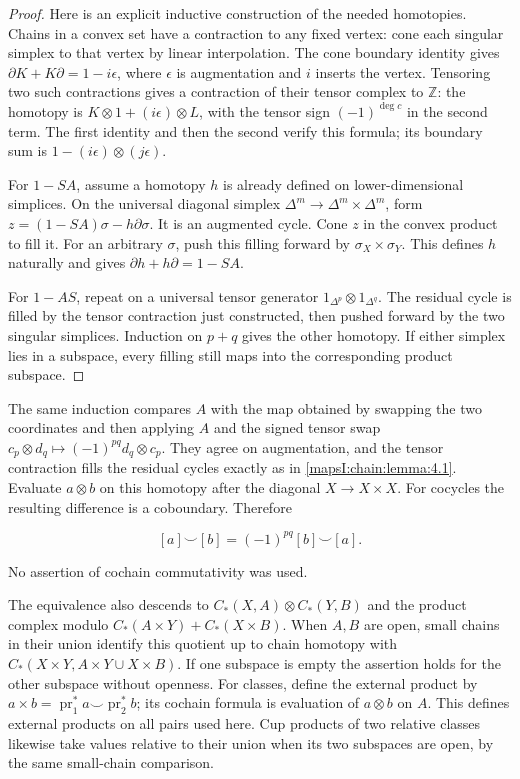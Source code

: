 \documentclass[11pt]{article}
\begin{document}
\begin{proof}
Here is an explicit inductive construction of the needed homotopies. Chains in a convex set have a contraction to any fixed vertex: cone each singular simplex to that vertex by linear interpolation. The cone boundary identity gives \(\partial K+K\partial=1-i\epsilon\), where \(\epsilon\) is augmentation and \(i\) inserts the vertex. Tensoring two such contractions gives a contraction of their tensor complex to \(\mathbb Z\): the homotopy is \(K\otimes1+(i\epsilon)\otimes L\), with the tensor sign \((-1)^{\deg c}\) in the second term. The first identity and then the second verify this formula; its boundary sum is \(1-(i\epsilon)\otimes(j\epsilon)\).

For \(1-SA\), assume a homotopy \(h\) is already defined on lower-dimensional simplices. On the universal diagonal simplex \(\Delta^m\to\Delta^m\times\Delta^m\), form
\(z=(1-SA)\sigma-h\partial\sigma\).
It is an augmented cycle. Cone \(z\) in the convex product to fill it. For an arbitrary \(\sigma\), push this filling forward by \(\sigma_X\times\sigma_Y\). This defines \(h\) naturally and gives \(\partial h+h\partial=1-SA\).

For \(1-AS\), repeat on a universal tensor generator \(1_{\Delta^p}\otimes1_{\Delta^q}\). The residual cycle is filled by the tensor contraction just constructed, then pushed forward by the two singular simplices. Induction on \(p+q\) gives the other homotopy. If either simplex lies in a subspace, every filling still maps into the corresponding product subspace.
\end{proof}

The same induction compares \(A\) with the map obtained by swapping the two coordinates and then applying \(A\) and the signed tensor swap
\(c_p\otimes d_q\mapsto(-1)^{pq}d_q\otimes c_p\).
They agree on augmentation, and the tensor contraction fills the residual cycles exactly as in \cref{mapsI:chain:lemma:4.1}. Evaluate \(a\otimes b\) on this homotopy after the diagonal \(X\to X\times X\). For cocycles the resulting difference is a coboundary. Therefore

\[
[a]\smile[b]=(-1)^{pq}[b]\smile[a].
\]

No assertion of cochain commutativity was used.

The equivalence also descends to
\(C_*(X,A)\otimes C_*(Y,B)\) and the product complex modulo
\(C_*(A\times Y)+C_*(X\times B)\).
When \(A,B\) are open, small chains in their union identify this quotient up to chain homotopy with
\(C_*(X\times Y,A\times Y\cup X\times B)\).
If one subspace is empty the assertion holds for the other subspace without openness. For classes, define the external product by \(a\times b=\operatorname{pr}_1^*a\smile\operatorname{pr}_2^*b\); its cochain formula is evaluation of \(a\otimes b\) on \(A\). This defines external products on all pairs used here. Cup products of two relative classes likewise take values relative to their union when its two subspaces are open, by the same small-chain comparison.
\end{document}

